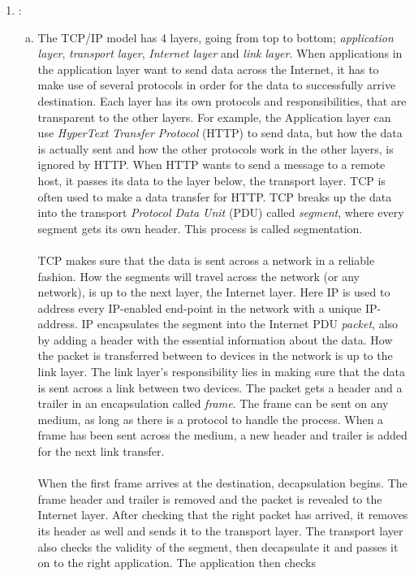 \documentclass[a4paper,9pt,fleqn]{article}
\begin{document}
\begin{enumerate}[{Task} 1]
\item :
\begin{enumerate}[a)]
\item 
The TCP/IP model has 4 layers, going from top to bottom; {\it application layer},
{\it transport layer}, {\it Internet layer} and {\it link layer}. When applications
in the application layer want to send data across the Internet, it has to make use of
several protocols in order for the data to successfully arrive 
destination. Each layer has its own protocols and responsibilities, that
are transparent to the other layers. For example, the Application layer can
use {\it HyperText Transfer Protocol} (HTTP) to send data, but how the data
is actually sent and how the other protocols work in the other layers, is
ignored by HTTP. When HTTP wants to send a message to a remote host, it
passes its data to the layer below, the transport layer. TCP is often used
to make a data transfer for HTTP. TCP breaks up the data into the transport {\it Protocol
Data Unit} (PDU) called {\it segment}, where every segment gets its own header.
This process is called segmentation.
\\
\\
TCP makes sure that the data is sent across a network in a reliable fashion.
How the segments will travel across the network (or any network), is up to the next
layer, the Internet layer. Here IP is used to address every IP-enabled end-point in
the network with a unique IP-address. IP encapsulates the segment into the
Internet PDU {\it packet}, also by adding a header with the essential
information about the data. How the packet is transferred between to
devices in the network is up to the link layer. The link layer's
responsibility lies in making sure that the data is sent across a link
between two devices. The packet gets a header and a trailer in an
encapsulation called {\it frame}. The frame can be sent on any medium, as long
as there is a protocol to handle the process. When a frame has been sent
across the medium, a new header and trailer is added for the next link
transfer.
\\
\\
When the first frame arrives at the destination, decapsulation begins.
The frame header and trailer is removed and the packet is revealed to the
Internet layer. After checking that the right packet has arrived, it
removes its header as well and sends it to the transport layer. The
transport layer also checks the validity of the segment, then decapsulate
it and passes it on to the right application. The application then checks

\end{enumerate}
\end{enumerate}
\end{document}
